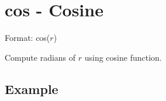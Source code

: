 
%

\section{cos - Cosine\label{sect:cos}}

Format: cos($r$)

Compute radians of $r$ using cosine function. 

\subsection*{Example}


%

